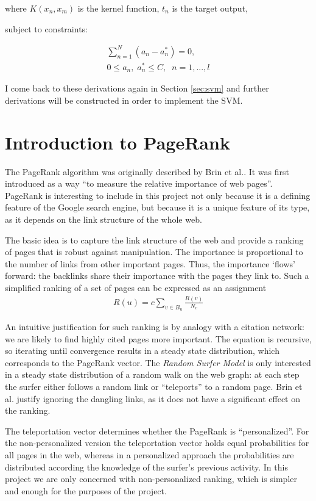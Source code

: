 \documentclass[12pt,a4paper,notitlepage,twoside]{scrbook}
\begin{document}
where \(K(x_n,x_m) \) is the kernel function, \(t_n\) is the target output,

subject to constraints:

\begin{gather}
  \sum_{n=1}^{N}(a_n-a_n^*)=0,\\
  0\leq a_n,\; a_n^*\leq C,\;\;    n=1,...,l 
\end{gather}

I come back to these derivations again in Section \ref{sec:svm} and further derivations
will be constructed in order to implement the SVM.
\section{Introduction to PageRank}
\label{prep:pr}
The PageRank algorithm was originally described by Brin et al.\cite{pagerank}.
It was first introduced as a way ``to measure the relative importance of web
pages''. PageRank is interesting to include in this project not only because it
is a defining feature of the Google search engine, but because it is a unique
feature of its type, as it depends on the link structure of the whole web.

The basic idea is to capture the link structure of the web and provide a ranking of pages
that is robust against manipulation. The importance is proportional to the number of links
from other important pages. Thus, the importance `flows' forward: the backlinks share
their importance with the pages they link to. Such a simplified ranking of a set of pages
can be expressed as an assignment
\begin{gather}
  R(u)=c\sum_{v\in B_u}\frac{R(v)}{N_v}
\end{gather}

An intuitive justification for such ranking is by analogy with a citation
network: we are likely to find highly cited pages more important.  The equation
is recursive, so iterating until convergence results in a steady state
distribution, which corresponds to the PageRank vector.  The \textit{Random
Surfer Model} is only interested in a steady state distribution of a random
walk on the web graph: at each step the surfer either follows a random link or
``teleports'' to a random page. Brin et al. justify ignoring the dangling
links, as it does not have a significant effect on the ranking. 

The teleportation vector determines whether the PageRank is ``personalized''. For
the non-personalized version the teleportation vector holds equal probabilities
for all pages in the web, whereas in a personalized approach the probabilities
are distributed according the knowledge of the surfer's previous activity. In
this project we are only concerned with non-personalized ranking, which is simpler and
enough for the purposes of the project.
\end{document}
